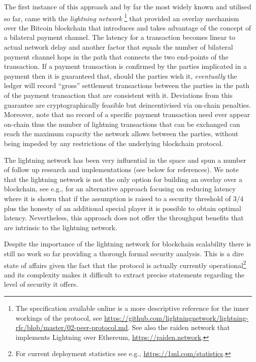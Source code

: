 The first instance of this approach and by far the most widely known and
utilised so far, came with the {\em lightning network}
\cite{lightning}\footnote{The specification available online is a more
descriptive reference for the inner workings of the protocol, see
\url{https://github.com/lightningnetwork/lightning-rfc/blob/master/02-peer-protocol.md}.
See also the raiden network that implements Lightning over Ethereum,
\url{https://raiden.network}.} that provided an overlay mechanism over the
Bitcoin blockchain that introduces and takes advantage of the concept of a
bilateral payment channel. The latency for a transaction becomes linear to
actual network delay and another factor that equals the number of bilateral
payment channel hops in the path that connects the two end-points of the
transaction. If a payment transaction is confirmed by the parties implicated in
a payment then it is guaranteed that, should the parties wish it, {\em
eventually} the ledger will record ``gross'' settlement transactions between the
parties in the path of the payment transaction that are consistent with it.
Deviations from this guarantee are cryptographically feasible but deincentivised
via on-chain penalties. Moreover, note that no record of a specific payment
transaction need ever appear on-chain thus the number of lightning transactions
that can be exchanged can reach the maximum capacity the network allows between
the parties, without being impeded by any restrictions of the underlying
blockchain protocol.

The lightning network has been very influential in the space and spun a number
of follow up research and implementations (see below for references). We note
that the lightning network is not the only option for building an overlay over a
blockchain, see e.g., \cite{DBLP:conf/eurocrypt/PassS18} for an alternative
approach focusing on reducing latency where it is shown that if the assumption
is raised to a security threshold of $3/4$ plus the honesty of an additional
special player it is possible to obtain optimal latency. Nevertheless, this
approach does not offer the throughput benefits that are intrinsic to the
lightning network.

Despite the importance of the lightning network for blockchain scalability there
is still no work so far providing a thorough formal security analysis. This is a
dire state of affairs given the fact that the protocol is actually currently
operational\footnote{For current deployment statistics see e.g.,
\url{https://1ml.com/statistics}.} and its complexity makes it difficult to
extract precise statements regarding the level of security it offers.

